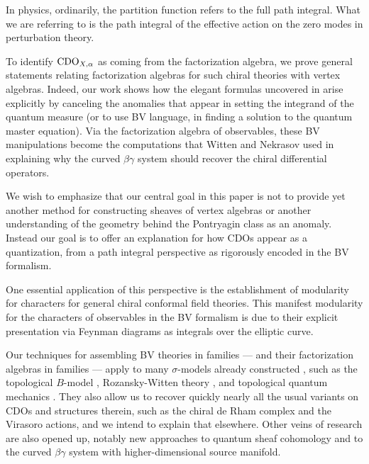 \begin{rmk*} 
In physics, ordinarily, the partition function refers to the full path integral.
What we are referring to is the path integral of the effective action on the zero modes in perturbation theory. 
\end{rmk*}

To identify ${\rm CDO}_{X,\alpha}$ as coming from the factorization algebra, we prove general statements relating factorization algebras for such chiral theories with vertex algebras. Indeed, our work shows how the elegant formulas uncovered in \cite{MSV,GMS} arise explicitly by canceling the anomalies that appear in setting the integrand of the quantum measure (or to use BV language, in finding a solution to the quantum master equation). Via the factorization algebra of observables, these BV manipulations become the computations that Witten and Nekrasov used in explaining why the curved $\beta\gamma$ system should recover the chiral differential operators.

\begin{rmk*}
We wish to emphasize that our central goal in this paper 
is not to provide yet another method for constructing sheaves of vertex algebras
or another understanding of the geometry behind the Pontryagin class as an anomaly.
Instead our goal is to offer an explanation for how CDOs appear as a quantization,
from a path integral perspective as rigorously encoded in the BV formalism.

One essential application of this perspective is the establishment of modularity for characters for general chiral conformal field theories. 
This manifest modularity for the characters of observables in the BV formalism is due to their explicit presentation via Feynman diagrams as integrals over the elliptic curve. 
\end{rmk*}


Our techniques for assembling BV theories in families --- and their factorization algebras in families --- apply to many $\sigma$-models already constructed , such as the topological $B$-model \cite{LiLi}, Rozansky-Witten theory \cite{CLL}, and topological quantum mechanics \cite{GG1, GLL}. They also allow us to recover quickly nearly all the usual variants on CDOs and structures therein, such as the chiral de Rham complex and the Virasoro actions, and we intend to explain that elsewhere. Other veins of research are also opened up, notably new approaches to quantum sheaf cohomology and to the curved $\beta\gamma$ system with higher-dimensional source manifold.

